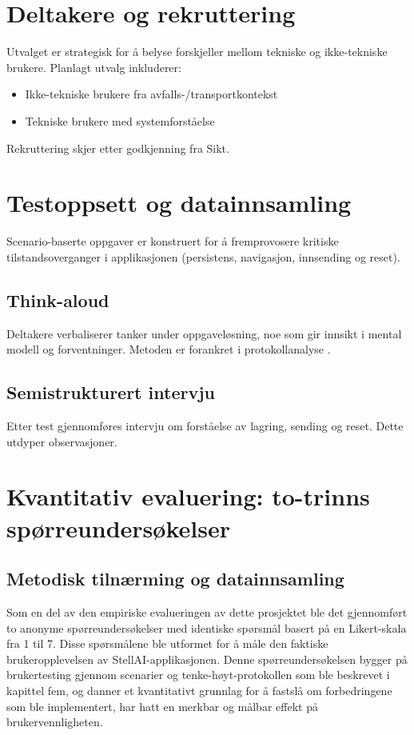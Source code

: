 \section{Deltakere og rekruttering}

Utvalget er strategisk for å belyse forskjeller mellom tekniske og ikke-tekniske brukere. Planlagt utvalg inkluderer:

\begin{itemize}
\item Ikke-tekniske brukere fra avfalls-/transportkontekst
\item Tekniske brukere med systemforståelse
\end{itemize}

Rekruttering skjer etter godkjenning fra Sikt.

\section{Testoppsett og datainnsamling}

Scenario-baserte oppgaver er konstruert for å fremprovosere kritiske tilstandsoverganger i applikasjonen (persistens, navigasjon, innsending og reset).

\subsection{Think-aloud}

Deltakere verbaliserer tanker under oppgaveløsning, noe som gir innsikt i mental modell og forventninger. Metoden er forankret i protokollanalyse \cite{ericsson1993}.

\subsection{Semistrukturert intervju}

Etter test gjennomføres intervju om forståelse av lagring, sending og reset. Dette utdyper observasjoner.

\section{Kvantitativ evaluering: to-trinns spørreundersøkelser}

\subsection{Metodisk tilnærming og datainnsamling}
Som en del av den empiriske evalueringen av dette prosjektet ble det gjennomført to anonyme spørreundersøkelser med identiske spørsmål basert på en Likert-skala fra 1 til 7. Disse spørsmålene ble utformet for å måle den faktiske brukeropplevelsen av StellAI-applikasjonen. Denne spørreundersøkelsen bygger på brukertesting gjennom scenarier og tenke-høyt-protokollen som ble beskrevet i kapittel fem, og danner et kvantitativt grunnlag for å fastslå om forbedringene som ble implementert, har hatt en merkbar og målbar effekt på brukervennligheten.

